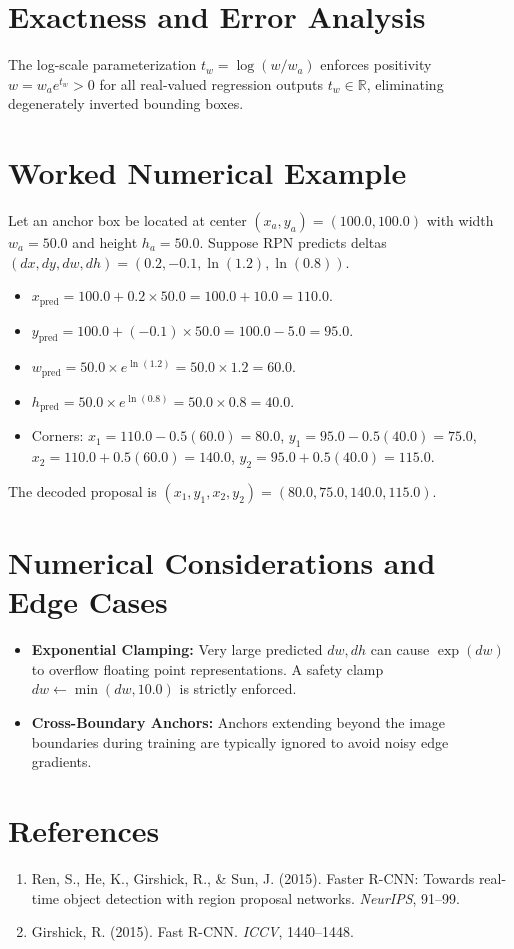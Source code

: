 \documentclass[11pt,a4paper]{article}
\theoremstyle{definition}
\begin{document}
\section{Exactness and Error Analysis}

The log-scale parameterization $t_w = \log(w / w_a)$ enforces positivity $w = w_a e^{t_w} > 0$ for all real-valued regression outputs $t_w \in \mathbb{R}$, eliminating degenerately inverted bounding boxes.

\section{Worked Numerical Example}

Let an anchor box be located at center $(x_a, y_a) = (100.0, 100.0)$ with width $w_a = 50.0$ and height $h_a = 50.0$.
Suppose RPN predicts deltas $(dx, dy, dw, dh) = (0.2, -0.1, \ln(1.2), \ln(0.8))$.
\begin{itemize}
    \item $x_{\text{pred}} = 100.0 + 0.2 \times 50.0 = 100.0 + 10.0 = 110.0$.
    \item $y_{\text{pred}} = 100.0 + (-0.1) \times 50.0 = 100.0 - 5.0 = 95.0$.
    \item $w_{\text{pred}} = 50.0 \times e^{\ln(1.2)} = 50.0 \times 1.2 = 60.0$.
    \item $h_{\text{pred}} = 50.0 \times e^{\ln(0.8)} = 50.0 \times 0.8 = 40.0$.
    \item Corners:
    $x_1 = 110.0 - 0.5(60.0) = 80.0$, $y_1 = 95.0 - 0.5(40.0) = 75.0$,
    $x_2 = 110.0 + 0.5(60.0) = 140.0$, $y_2 = 95.0 + 0.5(40.0) = 115.0$.
\end{itemize}
The decoded proposal is $(x_1, y_1, x_2, y_2) = (80.0, 75.0, 140.0, 115.0)$.

\section{Numerical Considerations and Edge Cases}

\begin{itemize}
    \item \textbf{Exponential Clamping:} Very large predicted $dw, dh$ can cause $\exp(dw)$ to overflow floating point representations. A safety clamp $dw \gets \min(dw, 10.0)$ is strictly enforced.
    \item \textbf{Cross-Boundary Anchors:} Anchors extending beyond the image boundaries during training are typically ignored to avoid noisy edge gradients.
\end{itemize}

\section{References}
\begin{enumerate}
    \item Ren, S., He, K., Girshick, R., \& Sun, J. (2015). Faster R-CNN: Towards real-time object detection with region proposal networks. \emph{NeurIPS}, 91--99.
    \item Girshick, R. (2015). Fast R-CNN. \emph{ICCV}, 1440--1448.
\end{enumerate}
\end{document}
